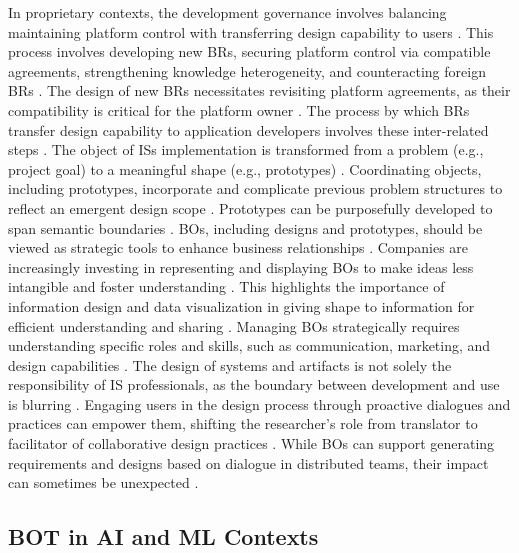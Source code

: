 \documentclass[12pt,oneside]{article}
\begin{document}
In proprietary contexts, the development governance involves balancing maintaining platform control with transferring design capability to users \citep[2]{ghazawneh2010governing}. This process involves developing new \ac{BR}s, securing platform control via compatible agreements, strengthening knowledge heterogeneity, and counteracting foreign \ac{BR}s \citep[14]{ghazawneh2010governing}. The design of new \ac{BR}s necessitates revisiting platform agreements, as their compatibility is critical for the platform owner \citep[13]{ghazawneh2010governing}. The process by which \ac{BR}s transfer design capability to application developers involves these inter-related steps \citep[14]{ghazawneh2010governing}. \newline
The object of \ac{IS}s implementation is transformed from a problem (e.g., project goal) to a meaningful shape (e.g., prototypes) \citep[5116]{weeger2017artefacts}. Coordinating objects, including prototypes, incorporate and complicate previous problem structures to reflect an emergent design scope \citep[5427]{gasson2021managing}. \newline
Prototypes can be purposefully developed to span semantic boundaries \citep[578]{doolin2012sociomateriality}. \ac{BO}s, including designs and prototypes, should be viewed as strategic tools to enhance business relationships \citep[232]{corsaro2018crossing}. Companies are increasingly investing in representing and displaying \ac{BO}s to make ideas less intangible and foster understanding \citep[232]{corsaro2018crossing}. This highlights the importance of information design and data visualization in giving shape to information for efficient understanding and sharing \citep[232]{corsaro2018crossing}. Managing \ac{BO}s strategically requires understanding specific roles and skills, such as communication, marketing, and design capabilities \citep[232]{corsaro2018crossing}. The design of systems and artifacts is not solely the responsibility of \ac{IS} professionals, as the boundary between development and use is blurring \citep[584]{doolin2012sociomateriality}. Engaging users in the design process through proactive dialogues and practices can empower them, shifting the researcher's role from translator to facilitator of collaborative design practices \citep[2, 11]{bakhaev2023cocreating}. While \ac{BO}s can support generating requirements and designs based on dialogue in distributed teams, their impact can sometimes be unexpected \citep[520]{mccarthy2020building}.

\subsection{BOT in AI and ML Contexts} \label{bot-in-ai-and-ml-contexts}
\end{document}
